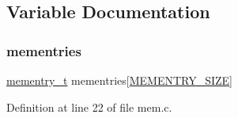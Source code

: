 \subsection{Variable Documentation}
\mbox{\label{a00116_a9ec3d7a60bca9bd965aba15905c6d1ed_a9ec3d7a60bca9bd965aba15905c6d1ed}} 
\subsubsection{\texorpdfstring{mementries}{mementries}}
{\footnotesize\ttfamily \hyperlink{a00119_a876b6ee19692762a87e4673911f9b8da_a876b6ee19692762a87e4673911f9b8da}{mementry\+\_\+t} mementries\mbox{[}\hyperlink{a00116_a48623ea6ed429e2f046b49041dde1dc5_a48623ea6ed429e2f046b49041dde1dc5}{M\+E\+M\+E\+N\+T\+R\+Y\+\_\+\+S\+I\+ZE}\mbox{]}}



Definition at line 22 of file mem.\+c.

